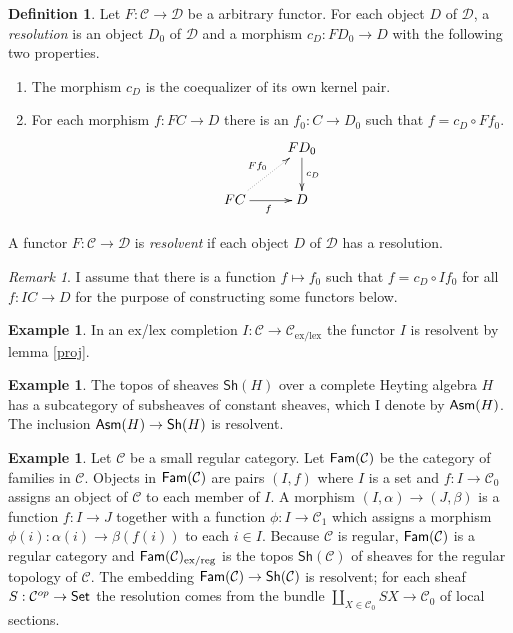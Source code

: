 \documentclass[sort&compress]{elsarticle}
\theoremstyle{plain}
\theoremstyle{definition}
\newtheorem{defin}[theorem]{Definition}
\newtheorem{example}[theorem]{Example}
\theoremstyle{remark}
\newtheorem{remark}[theorem]{Remark}
\newcommand\cat\mathcal
\newcommand\exlex{_\mathrm{ex/lex}}
\newcommand\exreg{_\mathrm{ex/reg}}
\begin{document}
\begin{defin} Let $F:\cat C\to\cat D$ be a arbitrary functor. For each object $D$ of $\cat D$, a \emph{resolution} is an object $D_0$ of $\cat D$ and a morphism $c_D:FD_0 \to D$ with the following two properties.
\begin{enumerate} 
\item The morphism $c_D$ is the coequalizer of its own kernel pair.
\item For each morphism $f:FC\to D$ there is an $f_0:C\to D_0$ such that $f=c_D\circ Ff_0$. 
\[ \xymatrix{
& FD_0 \ar[d]^{c_D} \\
FC\ar[r]_f \ar@{.>}[ur]^{Ff_0} & D
}\]
\end{enumerate}
A functor $F:\cat C\to\cat D$ is \emph{resolvent} if each object $D$ of $\cat D$ has a resolution.\label{resolve}
\end{defin}

\begin{remark} I assume that there is a function $f\mapsto f_0$ such that $f=c_D\circ If_0$ for all $f:IC\to D$ for the purpose of constructing some functors below. \end{remark}

\begin{example} In an ex/lex completion $I:\cat C \to\cat C\exlex$ the functor $I$ is resolvent by lemma \ref{proj}. \end{example}

\newcommand\Sh{\mathsf{Sh}}
\begin{example} The topos of sheaves $\Sh(H)$ over a complete Heyting algebra $H$ has a subcategory of subsheaves of constant sheaves, which I denote by $\mathsf{Asm}(H)$. The inclusion $\Asm(H) \to\Sh(H)$ is resolvent. \end{example}

\newcommand\dual{^{op}}
\begin{example} Let $\cat C$ be a small regular category. Let $\Fam(\cat C)$ be the category of families in $\cat C$. Objects in $\Fam(\cat C)$ are pairs $(I,f)$ where $I$ is a set and $f:I\to \cat C_0$ assigns an object of $\cat C$ to each member of $I$. A morphism $(I,\alpha) \to (J,\beta)$ is a function $f:I\to J$ together with a function $\phi:I \to \cat C_1$ which assigns a morphism $\phi(i):\alpha(i) \to \beta(f(i))$ to each $i\in I$. Because $\cat C$ is regular, $\Fam(\cat C)$ is a regular category and $\Fam(\cat C)\exreg$ is the topos $\Sh(\cat C)$ of sheaves for the regular topology of $\cat C$. The embedding $\Fam(\cat C)\to\Sh(\cat C)$ is resolvent; for each sheaf $S:\cat C\dual \to \Set$ the resolution comes from the bundle $\coprod_{X\in \cat C_0} SX \to \cat C_0$ of local sections. \label{famex}
\end{example}
\end{document}
